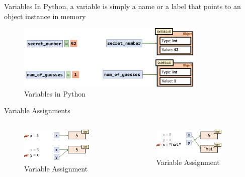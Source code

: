 \documentclass{beamer}
\begin{document}
\begin{frame}{Variables}
    In Python, a variable is simply a name or a label that points to an object instance in memory
    \begin{figure}
        \centering
        \includegraphics[width=0.8\textwidth]{pics/variable.png}
        \caption{Variables in Python}
    \end{figure}
\end{frame}

\begin{frame}{Variable Assignments}
    \begin{columns}
        \begin{figure}
            \centering
            \includegraphics[width=0.8\textwidth]{pics/assignment.png}
            \caption{Variable Assignment}
        \end{figure}
        \begin{figure}
            \centering
            \includegraphics[width=0.8\textwidth]{pics/assignment2.png}
            \caption{Variable Assignment}
        \end{figure}
    \end{columns}
    
\end{frame}
\end{document}
